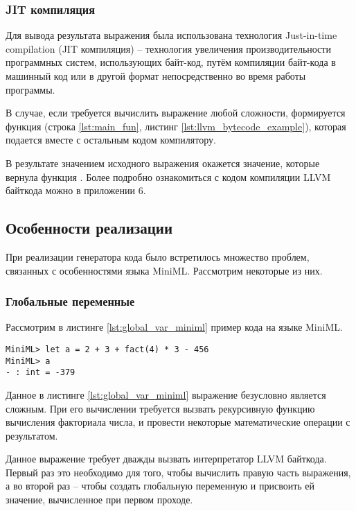 \subsubsection{JIT компиляция}

Для вывода результата выражения была использована технология Just-in-time compilation (JIT компиляция) --
технология увеличения производительности программных систем, использующих байт-код, путём компиляции байт-кода в машинный код или
в другой формат непосредственно во время работы программы.

В случае, если требуется вычислить выражение любой сложности,
формируется функция  (строка \ref{lst:main_fun}, листинг \ref{lst:llvm_bytecode_example}),
которая подается вместе с остальным кодом компилятору.

В результате значением исходного выражения окажется значение, которые вернула функция .
Более подробно ознакомиться с кодом компиляции LLVM байткода можно в приложении 6.

\subsection{Особенности реализации}

При реализации генератора кода было встретилось множество проблем, связанных с особенностями языка
MiniML.
Рассмотрим некоторые из них.

\subsubsection{Глобальные переменные}

Рассмотрим в листинге \ref{lst:global_var_miniml} пример кода на языке MiniML.
\begin{lstlisting}[caption=Создание глабальной переменной
                  , label=lst:global_var_miniml]
MiniML> let a = 2 + 3 + fact(4) * 3 - 456
MiniML> a
- : int = -379
\end{lstlisting}

Данное в листинге \ref{lst:global_var_miniml} выражение безусловно является сложным. При его вычислении требуется вызвать рекурсивную
функцию вычисления факториала числа, и провести некоторые математические операции с результатом.

Данное выражение требует дважды вызвать интерпретатор LLVM байткода.
Первый раз это необходимо для того, чтобы вычислить правую часть выражения,
а во второй раз -- чтобы создать глобальную переменную  и присвоить ей значение,
вычисленное при первом проходе.

